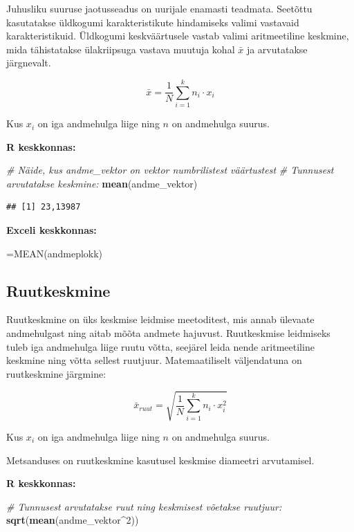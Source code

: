\documentclass[
]{book}
\newenvironment{Shaded}{\begin{snugshade}}{\end{snugshade}}
\newcommand{\CommentTok}[1]{\textcolor[rgb]{0.56,0.35,0.01}{\textit{#1}}}
\newcommand{\DecValTok}[1]{\textcolor[rgb]{0.00,0.00,0.81}{#1}}
\newcommand{\FunctionTok}[1]{\textcolor[rgb]{0.13,0.29,0.53}{\textbf{#1}}}
\newcommand{\NormalTok}[1]{#1}
\newcommand{\SpecialCharTok}[1]{\textcolor[rgb]{0.81,0.36,0.00}{\textbf{#1}}}
\renewenvironment{Shaded} {\begin{snugshade}\footnotesize} {\end{snugshade}}
\begin{document}
Juhusliku suuruse jaotusseadus on uurijale enamasti teadmata. Seetõttu kasutatakse üldkogumi karakteristikute hindamiseks valimi vastavaid karakteristikuid. Üldkogumi keskväärtusele vastab valimi aritmeetiline keskmine, mida tähistatakse ülakriipsuga vastava muutuja kohal \(\bar x\) ja arvutatakse järgnevalt.

\[ \bar x=\frac{1}{N}\sum_{i=1}^{k}n_i \cdot x_i \]

Kus \(x_{i}\) on iga andmehulga liige ning \(n\) on andmehulga suurus.

\textbf{R keskkonnas:}

\begin{Shaded}
\begin{Highlighting}[]
\CommentTok{\# Näide, kus andme\_vektor on vektor numbrilistest väärtustest}
\CommentTok{\# Tunnusest arvutatakse keskmine:}
\FunctionTok{mean}\NormalTok{(andme\_vektor)}
\end{Highlighting}
\end{Shaded}

\begin{verbatim}
## [1] 23,13987
\end{verbatim}

\textbf{Exceli keskkonnas:}

\begin{Shaded}
\begin{Highlighting}[]
\NormalTok{=MEAN(andmeplokk)}
\end{Highlighting}
\end{Shaded}

\subsection{Ruutkeskmine}\label{ruutkeskmine}

Ruutkeskmine on üks keskmise leidmise meetoditest, mis annab ülevaate andmehulgast ning aitab mõõta andmete hajuvust. Ruutkeskmise leidmiseks tuleb iga andmehulga liige ruutu võtta, seejärel leida nende aritmeetiline keskmine ning võtta sellest ruutjuur. Matemaatiliselt väljendatuna on ruutkeskmine järgmine:

\[ \bar x_{ruut}=\sqrt{\frac{1}{N}\sum_{i=1}^{k}n_i \cdot x_i^2} \]

Kus \(x_{i}\) on iga andmehulga liige ning \(n\) on andmehulga suurus.

Metsanduses on ruutkeskmine kasutusel keskmise diameetri arvutamisel.

\textbf{R keskkonnas:}

\begin{Shaded}
\begin{Highlighting}[]
\CommentTok{\# Tunnusest arvutatakse ruut ning keskmisest võetakse ruutjuur:}
\FunctionTok{sqrt}\NormalTok{(}\FunctionTok{mean}\NormalTok{(andme\_vektor}\SpecialCharTok{\^{}}\DecValTok{2}\NormalTok{))}
\end{Highlighting}
\end{Shaded}
\end{document}
